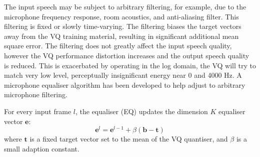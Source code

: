 \documentclass{article}
\begin{document}
{The input speech may be subject to arbitrary filtering, for example, due to the microphone frequency response, room acoustics, and anti-aliasing filter.  This filtering is fixed or slowly time-varying.  The filtering biases the target vectors away from the VQ training material, resulting in significant additional mean square error.  The filtering does not greatly affect the input speech quality, however the VQ performance distortion increases and the output speech quality is reduced.  This is exacerbated by operating in the log domain, the VQ will try to match very low level, perceptually insignificant energy near 0 and 4000 Hz. A microphone equaliser algorithm has been developed to help adjust to arbitrary microphone filtering.

For every input frame $l$, the equaliser (EQ) updates the dimension $K$ equaliser vector $\mathbf{e}$:
\begin{equation}
\mathbf{e}^{l} = \mathbf{e}^{l-1} + \beta(\mathbf{b} - \mathbf{t})
\end{equation}
where $\mathbf{t}$ is a fixed target vector set to the mean of the VQ quantiser, and $\beta$ is a small adaption constant.

}
\end{document}
